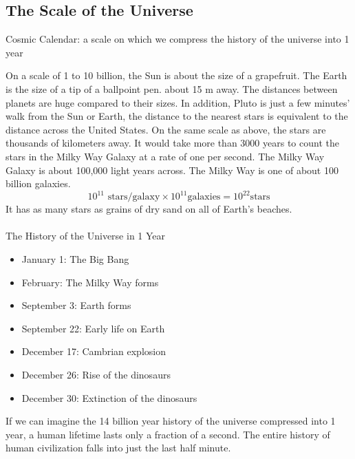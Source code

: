\documentclass[12pt]{article}
\begin{document}
\subsection{The Scale of the Universe}
\begin{definition} Cosmic Calendar: a scale on which we compress the history of the universe into 1 year \end{definition} 
On a scale of 1 to 10 billion, the Sun is about the size of a grapefruit. The Earth is the size of a tip of a ballpoint pen. about 15 m away. The distances between planets are huge compared to their sizes. In addition, Pluto is just a few minutes' walk from the Sun or Earth, the distance to the nearest stars is equivalent to the distance across the United States. On the same scale as above, the stars are thousands of kilometers away. It would take more than 3000 years to count the stars in the Milky Way Galaxy at a rate of one per second. The Milky Way Galaxy is about 100,000 light years across. \newline
The Milky Way is one of about 100 billion galaxies. 
$$ 10^{11} \text{ stars/galaxy} \times 10^{11} \text{galaxies} = 10^{22} \text{stars} $$
It has as many stars as grains of dry sand on all of Earth's beaches. \\~\\ 
The History of the Universe in 1 Year \begin{itemize} 
\item January 1: The Big Bang 
\item February: The Milky Way forms 
\item September 3: Earth forms 
\item September 22: Early life on Earth 
\item December 17: Cambrian explosion
\item December 26: Rise of the dinosaurs 
\item December 30: Extinction of the dinosaurs \end{itemize} 
If we can imagine the 14 billion year history of the universe compressed into 1 year, a human lifetime lasts only a fraction of a second. The entire history of human civilization falls into just the last half minute. 
\end{document}
